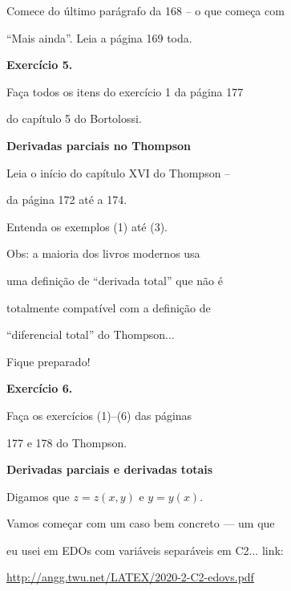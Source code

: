 \documentclass[oneside,12pt]{article}
\begin{document}
Comece do último parágrafo da 168 -- o que começa com

``Mais ainda''. Leia a página 169 toda.

\bsk

{\bf Exercício 5.}

Faça todos os itens do exercício 1 da página 177

do capítulo 5 do Bortolossi.


\newpage


{\bf Derivadas parciais no Thompson}

Leia o início do capítulo XVI do Thompson --

da página 172 até a 174.

Entenda os exemplos (1) até (3).

\msk

Obs: a maioria dos livros modernos usa

uma definição de ``derivada total'' que não é

totalmente compatível com a definição de

``diferencial total'' do Thompson...

Fique preparado!

\bsk

{\bf Exercício 6.}

Faça os exercícios (1)--(6) das páginas

177 e 178 do Thompson.





\newpage


{\bf Derivadas parciais e derivadas totais}

Digamos que $z = z(x,y)$ e $y = y(x)$.

\msk

Vamos começar com um caso bem concreto --- um que

eu usei em EDOs com variáveis separáveis em C2... link:
\ssk

{\footnotesize

\url{http://angg.twu.net/LATEX/2020-2-C2-edovs.pdf}

}
\end{document}
